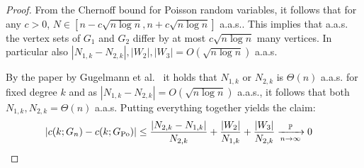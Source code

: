 \begin{proof}
From the Chernoff bound for Poisson random variables, it follows that for any $c>0$, $N \in [n-c\sqrt{n\log n},n+c\sqrt{n\log n}]$ a.a.s.. This implies that a.a.s. the vertex sets of $G_1$ and $G_2$ differ by at most $c\sqrt{n\log n}$ many vertices. In particular also $|N_{1,k}-N_{2,k}|,|W_2|,|W_3|=O(\sqrt{n \log n})$ a.a.s. 

By the paper by Gugelmann et al.~\cite{gugelmann2012random} it holds that $N_{1,k}$ or $N_{2,k}$ is $\Theta(n)$ a.a.s. for fixed degree $k$ and as $|N_{1,k}-N_{2,k}| =O(\sqrt{n\log n})$ a.a.s., it follows that both $N_{1,k},N_{2,k} = \Theta(n)$ a.a.s. Putting everything together yields the claim:
\begin{align*}
|c(k;G_n)-c(k;G_{\text{Po}})| &\leq \frac{|N_{2,k}-N_{1,k}|}{N_{2,k}}+\frac{|W_2|}{N_{1,k}}+\frac{|W_3|}{N_{2,k}} \xrightarrow[n\rightarrow\infty]{\mathbb{P}} 0
\end{align*}


\end{proof}


